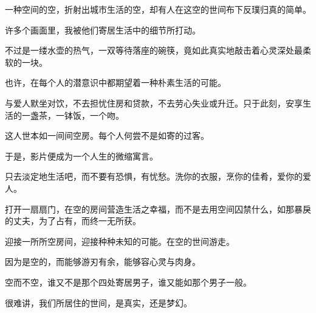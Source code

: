 		一种空间的空，折射出城市生活的空，却有人在这空的世间布下反璞归真的简单。\par
		许多个画面里，我被他们寄居生活中的细节所打动。\par
		不过是一缕水壶的热气，一双等待落座的碗筷，竟如此真实地敲击着心灵深处最柔软的一块。\par
		也许，在每个人的潜意识中都期望着一种朴素生活的可能。\par
		与爱人默坐对饮，不去担忧住房和贷款，不去劳心失业或升迁。只于此刻，安享生活的一盏茶，一钵饭，一个吻。\par
		这人世本如一间间空房。每个人何尝不是如寄的过客。\par
		于是，影片便成为一个人生的微缩寓言。\par
		只去淡定地生活吧，而不要有恐惧，有忧愁。洗你的衣服，烹你的佳肴，爱你的爱人。\par
		打开一扇扇门，在空的房间营造生活之幸福，而不是去用空间囚禁什么，如那暴戾的丈夫，为了占有，而终一无所获。\par
		迎接一所所空房间，迎接种种未知的可能。在空的世间游走。\par
		因为是空的，而能够游刃有余，能够容心灵与肉身。\par
		空而不空，谁又不是那个四处寄居男子，谁又能如那个男子一般。



		很难讲，我们所居住的世间，是真实，还是梦幻。

